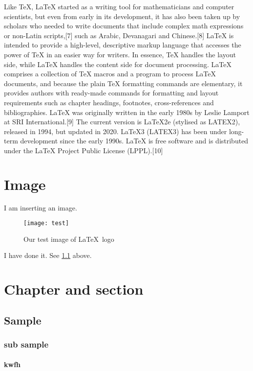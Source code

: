 \documentclass[a4paper,12pt]{report}
\begin{document}
	Like TeX, LaTeX started as a writing tool for mathematicians and computer scientists, but even from early in its development, it has also been taken up by scholars who needed to write documents that include complex math expressions or non-Latin scripts,[7] such as Arabic, Devanagari and Chinese.[8]
LaTeX is intended to provide a high-level, descriptive markup language that accesses the power of TeX in an easier way for writers. In essence, TeX handles the layout side, while LaTeX handles the content side for document processing. LaTeX comprises a collection of TeX macros and a program to process LaTeX documents, and because the plain TeX formatting commands are elementary, it provides authors with ready-made commands for formatting and layout requirements such as chapter headings, footnotes, cross-references and bibliographies.
LaTeX was originally written in the early 1980s by Leslie Lamport at SRI International.[9] The current version is LaTeX2e (stylised as LATEX2), released in 1994, but updated in 2020. LaTeX3 (LATEX3) has been under long-term development since the early 1990s. LaTeX is free software and is distributed under the LaTeX Project Public License (LPPL).[10]


	\chapter{Image}
	I am inserting an image.\\
	
	\begin{figure}[!h]
		\begin{center}
			\texttt{[image: test]}
			\caption{Our test image of \LaTeX \ logo}
			\label{fig:logo}
		\end{center}
	\end{figure}
	\noindent I have done it. See \ref{fig:logo} above.
	\chapter{Chapter and section}
		\section{Sample}
			\subsection{sub sample}
				\subsubsection{kwfh}
\end{document}
